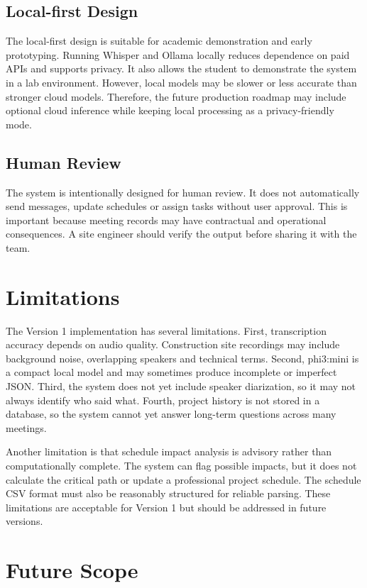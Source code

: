 \documentclass[11pt,a4paper]{article}
\begin{document}
\subsection{Local-first Design}

The local-first design is suitable for academic demonstration and early prototyping. Running Whisper and Ollama locally reduces dependence on paid APIs and supports privacy. It also allows the student to demonstrate the system in a lab environment. However, local models may be slower or less accurate than stronger cloud models. Therefore, the future production roadmap may include optional cloud inference while keeping local processing as a privacy-friendly mode.

\subsection{Human Review}

The system is intentionally designed for human review. It does not automatically send messages, update schedules or assign tasks without user approval. This is important because meeting records may have contractual and operational consequences. A site engineer should verify the output before sharing it with the team.

\section{Limitations}

The Version 1 implementation has several limitations. First, transcription accuracy depends on audio quality. Construction site recordings may include background noise, overlapping speakers and technical terms. Second, phi3:mini is a compact local model and may sometimes produce incomplete or imperfect JSON. Third, the system does not yet include speaker diarization, so it may not always identify who said what. Fourth, project history is not stored in a database, so the system cannot yet answer long-term questions across many meetings.

Another limitation is that schedule impact analysis is advisory rather than computationally complete. The system can flag possible impacts, but it does not calculate the critical path or update a professional project schedule. The schedule CSV format must also be reasonably structured for reliable parsing. These limitations are acceptable for Version 1 but should be addressed in future versions.

\section{Future Scope}
\end{document}
